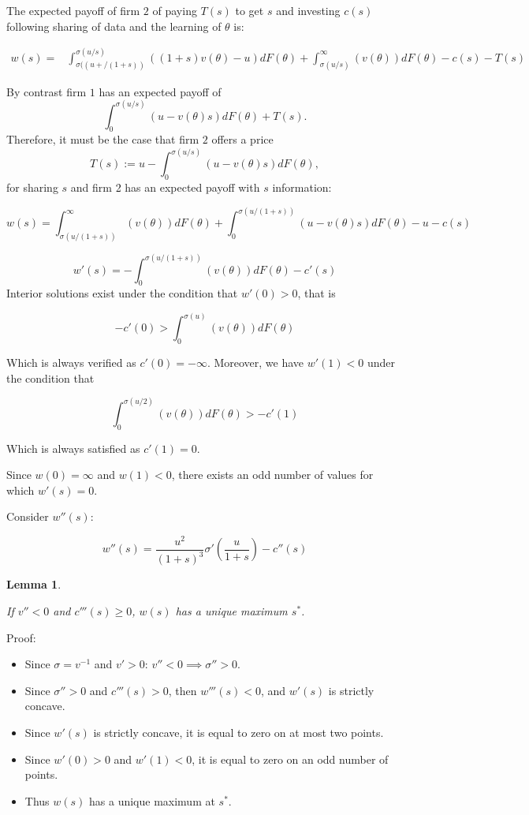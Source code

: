 \documentclass[a4paper,leqno]{article}%
\newtheorem{lemma}{Lemma}
\renewcommand{\t}{\theta}
\newcommand{\s}{\sigma}
\begin{document}
The expected payoff of firm $2$ of paying $T(s)$ to get $s$ and investing $c(s)$ following sharing of data and the learning of $\t$ is:
%


\begin{equation}
    \begin{aligned}
w(s)=&\int_{\s((u+/(1+s))}^{\s(u/s)} ((1+s)v(\t)-u)dF(\t)+\int_{\s(u/s)}^\infty (v(\t))dF(\t)-c(s)-T(s)
\end{aligned}
\end{equation}

By contrast firm $1$ has an expected payoff of 
\begin{equation}\label{value-merger-firm1}
    \int_{0}^{\s(u/s)}(u-v(\t)s)dF(\t)+T(s).
\end{equation}
%
Therefore, it must be the case that firm $2$ offers a price
%
\[
T(s):=u-\int_{0}^{\s(u/s)}(u-v(\t)s)dF(\t),
\]
%
for sharing $s$ and firm 2 has an expected payoff with $s$ information:


\[
w(s)=\int_{\s(u/(1+s))}^\infty (v(\t))dF(\t)+\int_{0}^{\s(u/(1+s))}(u-v(\t)s)dF(\t)-u-c(s)
\]

\[
w'(s)=-\int_{0}^{\s(u/(1+s))}(v(\t))dF(\t)-c'(s)
\]
Interior solutions exist under the condition that $w'(0)>0$, that is

\[
-c'(0)>\int_{0}^{\s(u)}(v(\t))dF(\t)
\]

Which is always verified as $c'(0)=-\infty$. Moreover, we have $w'(1)<0$ under the condition that

\[
\int_{0}^{\s(u/2)}(v(\t))dF(\t)> -c'(1)
\]


Which is always satisfied as $c'(1)=0$.

%

Since $w(0)=\infty$ and $w(1)<0$, there exists an odd number of values for which $w'(s)=0$. 

Consider $w''(s)$:

\[
w''(s)=\frac{u^2}{(1+s)^3}\s'(\frac{u}{1+s})-c''(s)
\]

\medskip 

\begin{lemma}~~

If $v''<0$ and $c'''(s)\geq0$, $w(s)$ has a unique maximum $s^*$.
\end{lemma}

Proof: 

\begin{itemize}
    \item Since $\s=v^{-1}$ and $v'>0$: $v''<0\implies \s''>0$.
    \item Since $\s''>0$ and $c'''(s)>0$, then $w'''(s)<0$, and $w'(s)$ is strictly concave.
    \item Since $w'(s)$ is strictly concave, it is equal to zero on at most two points.
    \item Since $w'(0)>0$ and $w'(1)<0$, it is equal to zero on an odd number of points.
    \item Thus $w(s)$ has a unique maximum at $s^*$.
\end{itemize}
\end{document}
